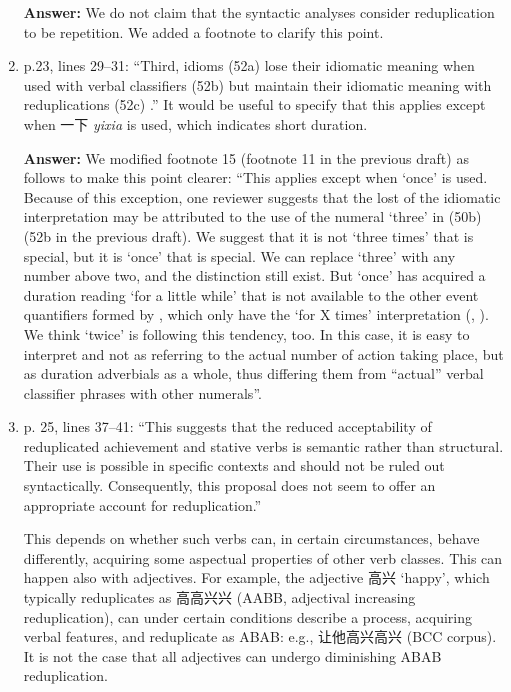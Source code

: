 \documentclass[fleqn,twoside]{article}
\begin{document}
\begin{enumerate}
\noindent
\textbf{Answer:} We do not claim that the syntactic analyses consider reduplication to be repetition. We added a footnote to clarify this point.


\item p.23, lines 29--31: ``Third, idioms (52a) lose their idiomatic meaning when used with verbal classifiers
(52b) but maintain their idiomatic meaning with reduplications (52c) \citep[230--231]{YangWei2017}.''
It would be useful to specify that this applies except when 一下 \textit{yixia} is used, which indicates short
duration.

\noindent
\textbf{Answer:} We modified footnote 15 (footnote 11 in the previous draft) as follows to make this point clearer: ``This applies except when  `once' is used. Because of this exception, one reviewer suggests that the lost of the idiomatic interpretation may be attributed to the use of the numeral  `three' in (50b) (52b in the previous draft). We suggest that it is not   `three times' that is special, 
but it is   `once' that is special.
We can replace  `three' with any number above two,
and the distinction still exist.
But   `once' has acquired a duration reading `for a little while' that is not available to the other event quantifiers formed by , which only have the `for X times' interpretation (\citealt[77]{Deng2013}, \citealt[16]{Zhang2000}).
We think   `twice' is following this tendency, too.
In this case, it is easy to interpret   and   not as referring to the actual number of action taking place,
but as duration adverbials as a whole,
thus differing them from ``actual'' verbal classifier phrases with other numerals''.


\item p. 25, lines 37--41: ``This suggests that the reduced acceptability of reduplicated achievement and
stative verbs is semantic rather than structural. Their use is possible in specific contexts and should
not be ruled out syntactically. Consequently, this proposal does not seem to offer an appropriate
account for reduplication.''

This depends on whether such verbs can, in certain circumstances, behave differently, acquiring some
aspectual properties of other verb classes. This can happen also with adjectives. For example, the
adjective 高兴 `happy', which typically reduplicates as 高高兴兴 (AABB, adjectival increasing
reduplication), can under certain conditions describe a process, acquiring verbal features, and
reduplicate as ABAB: e.g., 让他高兴高兴 (BCC corpus). It is not the case that all adjectives can
undergo diminishing ABAB reduplication.


\end{enumerate}
\end{document}
